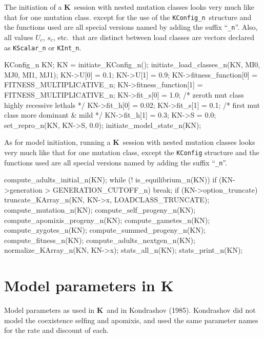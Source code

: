 \documentclass[12pt,twoside,letterpaper,fleqn]{report}
\numberwithin{equation}{section}  %
\newcommand{\K}{{\bf K}}
\newcommand{\KConfign}{\mbox{\tt KConfig\_n}}
\begin{document}
{The initiation of a \K\ session with nested mutation classes looks very much like that for one mutation class.   except for the use of the \KConfign\ structure and the functions used are all special versions named by adding the suffix ``\lstinline{_n}''.  Also, all values $U_c$, $s_c$, etc.\ that are distinct between load classes are vectors declared as \lstinline{KScalar_n} or \lstinline{KInt_n}.
\begin{C}[gobble=4]
    KConfig_n KN;
    KN = initiate_KConfig_n();
    initiate_load_classes_n(KN, MI0, MJ0, MI1, MJ1);
    KN->U[0] = 0.1;
    KN->U[1] = 0.9;
    KN->fitness_function[0] = FITNESS_MULTIPLICATIVE_n;
    KN->fitness_function[1] = FITNESS_MULTIPLICATIVE_n;
    KN->fit_s[0] = 1.0;  /* zeroth mut class highly recessive lethals */
    KN->fit_h[0] = 0.02;
    KN->fit_s[1] = 0.1;  /* first mut class more dominant & mild */
    KN->fit_h[1] = 0.3;
    KN->S = 0.0;
    set_repro_n(KN, KN->S, 0.0);
    initiate_model_state_n(KN);
\end{C}
As for model initiation, running a \K\ session with nested mutation classes looks very much like that for one mutation class, except the \lstinline{KConfig} structure and the functions used are all special versions named by adding the suffix ``\lstinline{_n}''.
\begin{C}[gobble=4]
    compute_adults_initial_n(KN);
    while (! is_equilibrium_n(KN)) {
        if (KN->generation > GENERATION_CUTOFF_n)
            break;
        if (KN->option_truncate)
            truncate_KArray_n(KN, KN->x, LOADCLASS_TRUNCATE);
        compute_mutation_n(KN);
        compute_self_progeny_n(KN);
        compute_apomixis_progeny_n(KN);
        compute_gametes_n(KN);
        compute_zygotes_n(KN);
        compute_summed_progeny_n(KN);
        compute_fitness_n(KN);
        compute_adults_nextgen_n(KN);
        normalize_KArray_n(KN, KN->x);
    }
    stats_all_n(KN);
    stats_print_n(KN);
\end{C}


\chapter{Model parameters in \K}

Model parameters as used in \K\ and in Kondrashov (1985).  \dag\/Kondrashov did not model the coexistence selfing and apomixis, and used the same parameter names for the rate and discount of each.

}
\end{document}
